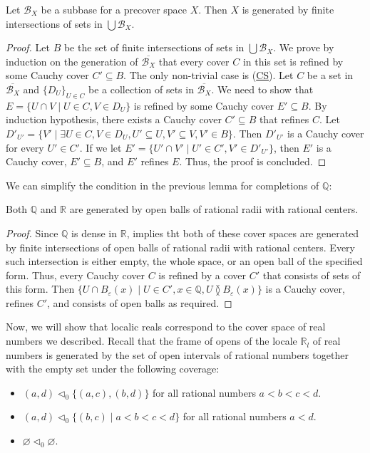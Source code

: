 \documentclass[reqno]{amsart}
\newcommand{\axref}[1]{(\hyperref[ax:#1]{#1})}
\theoremstyle{definition}
\theoremstyle{remark}
\numberwithin{figure}{section}
\newcommand{\overlap}[2]{#1 \between #2}
\begin{document}
\begin{lem}
Let $\mathcal{B}_X$ be a subbase for a precover space $X$.
Then $X$ is generated by finite intersections of sets in $\bigcup \mathcal{B}_X$.
\end{lem}
\begin{proof}
Let $B$ be the set of finite intersections of sets in $\bigcup \mathcal{B}_X$.
We prove by induction on the generation of $\overline{\mathcal{B}_X}$ that every cover $C$ in this set is refined by some Cauchy cover $C' \subseteq B$.
The only non-trivial case is \axref{CS}.
Let $C$ be a set in $\overline{\mathcal{B}_X}$ and $\{ D_U \}_{U \in C}$ be a collection of sets in $\overline{\mathcal{B}_X}$.
We need to show that $E = \{ U \cap V \mid U \in C, V \in D_U \}$ is refined by some Cauchy cover $E' \subseteq B$.
By induction hypothesis, there exists a Cauchy cover $C' \subseteq B$ that refines $C$.
Let $D'_{U'} = \{ V' \mid \exists U \in C, V \in D_U, U' \subseteq U, V' \subseteq V, V' \in B \}$.
Then $D'_{U'}$ is a Cauchy cover for every $U' \in C'$.
If we let $E' = \{ U' \cap V' \mid U' \in C', V' \in D'_{U'} \}$, then $E'$ is a Cauchy cover, $E' \subseteq B$, and $E'$ refines $E$.
Thus, the proof is concluded.
\end{proof}

We can simplify the condition in the previous lemma for completions of $\mathbb{Q}$:

\begin{lem}
Both $\mathbb{Q}$ and $\mathbb{R}$ are generated by open balls of rational radii with rational centers.
\end{lem}
\begin{proof}
Since $\mathbb{Q}$ is dense in $\mathbb{R}$,  implies tht both of these cover spaces are generated by finite intersections of open balls of rational radii with rational centers.
Every such intersection is either empty, the whole space, or an open ball of the specified form.
Thus, every Cauchy cover $C$ is refined by a cover $C'$ that consists of sets of this form.
Then $\{ U \cap B_\varepsilon(x) \mid U \in C', x \in \mathbb{Q}, \overlap{U}{B_\varepsilon(x)} \}$ is a Cauchy cover, refines $C'$, and consists of open balls as required.
\end{proof}

Now, we will show that localic reals correspond to the cover space of real numbers we described.
Recall that the frame of opens of the locale $\mathbb{R}_l$ of real numbers is generated by the set of open intervals of rational numbers together with the empty set under the following coverage:
\begin{itemize}
\item $(a,d) \triangleleft_0 \{ (a,c), (b,d) \}$ for all rational numbers $a < b < c < d$.
\item $(a,d) \triangleleft_0 \{ (b,c) \mid a < b < c < d \}$ for all rational numbers $a < d$.
\item $\varnothing \triangleleft_0 \varnothing$.
\end{itemize}
\end{document}

